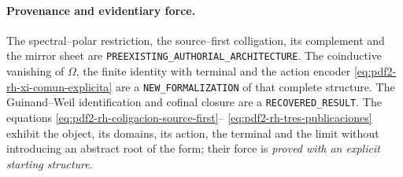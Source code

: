 \paragraph{Provenance and evidentiary force.}
The spectral--polar restriction, the source--first colligation, its complement and
the mirror sheet are \texttt{PREEXISTING\_AUTHORIAL\_ARCHITECTURE}. The
coinductive vanishing of \(\Omega\), the finite identity with terminal and the
action encoder
\eqref{eq:pdf2-rh-xi-comun-explicita} are a
\texttt{NEW\_FORMALIZATION} of that complete structure. The
Guinand--Weil identification and cofinal closure are a \texttt{RECOVERED\_RESULT}. The
equations
\eqref{eq:pdf2-rh-coligacion-source-first}--
\eqref{eq:pdf2-rh-tres-publicaciones} exhibit the object, its domains, its
action, the terminal and the limit without introducing an abstract root of the form;
their force is \emph{proved with an explicit starting structure}.
